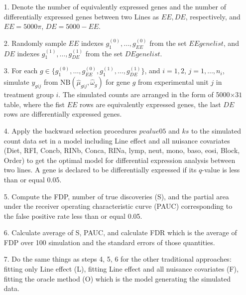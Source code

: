 \documentclass[12pt, letter]{article}\usepackage[]{graphicx}\usepackage[]{color}
\begin{document}
\begin{itemize}
\item[1. ] Denote the number of equivalently expressed genes and the number of differentially expressed genes between two Lines as $EE, DE$, respectively, and $EE = 5000\pi$, $DE = 5000-EE$.

\item[2. ] Randomly sample $EE$ indexes $g^{(0)}_1, \dots, g^{(0)}_{EE}$ from the set $EEgenelist$, and $DE$ indexes $g^{(1)}_1, \dots, g^{(1)}_{DE}$ from the set $DEgenelist$.

\item[3.] For each $g \in \{ g^{(0)}_1, \dots, g^{(0)}_{EE}, g^{(1)}_1, \dots, g^{(1)}_{DE}\}$, and $i = 1, 2$, $j = 1, \dots, n_i $,  simulate  $y_{gij}$ from $\mbox{NB}(\hat{\mu}_{gij}, \hat{\omega}_{g})$ for gene $g$ from experimental unit $j$ in treatment group $i$. The simulated counts are arranged in the form of 5000$\times 31$ table, where the fist $EE$ rows are equivalently expressed genes, the last $DE$ rows are differentially expressed genes.

\item[4. ] Apply the backward selection procedures $pvalue05$ and $ks$ to the simulated count data set in a model including Line effect and all nuisance covariates (Diet, RFI, Concb, RINb, Conca, RINa, lymp, neut, mono, baso, eosi, Block, Order) to get the optimal model for  differential expression analysis  between two lines. A gene is declared to be differentially expressed if its $q$-value is less than or equal 0.05.

\item[5. ] Compute the FDP, number of true discoveries (S), and the partial area under the receiver operating  characteristic curve (PAUC) corresponding to the false positive rate less than or equal 0.05. 

\item[6.] Calculate average of  S, PAUC, and calculate FDR which is the average of FDP over 100 simulation and the standard errors of those quantities.

\item[7. ] Do the same things as steps 4, 5, 6 for the other traditional approaches: fitting only Line effect (L), fitting Line effect and all nuisance covariates (F), fitting the oracle method (O)  which is the model generating the simulated data. 
\end{itemize}
\end{document}
